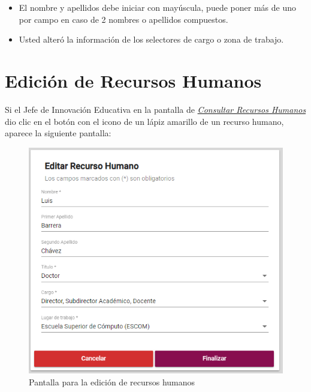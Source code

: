 \begin{itemize}
                        \begin{itemize}
                            \item El nombre y apellidos debe iniciar con mayúscula, puede poner más de uno por campo en caso de 2 nombres o apellidos compuestos.
                            \item Usted alteró la información de los selectores de cargo o zona de trabajo.
                        \end{itemize}
                    
                \end{itemize}

\newpage

            \hypertarget{editar-RH}{}
            \section{Edición de Recursos Humanos}
                Si el Jefe de Innovación Educativa en la pantalla de \hyperlink{consultarRH}{\textit{Consultar Recursos Humanos}} dio clic en el botón con el icono de un lápiz amarillo de un recurso humano, aparece la siguiente pantalla:
                
                \begin{figure}[!hbtp]
                    \centering
                    \hypertarget{editarUs}{\includegraphics[width=0.6\linewidth]{images/SP1/EditarRH}}
                    \caption{Pantalla para la edición de recursos humanos}
                    \label{editarrh}
                \end{figure}
                

